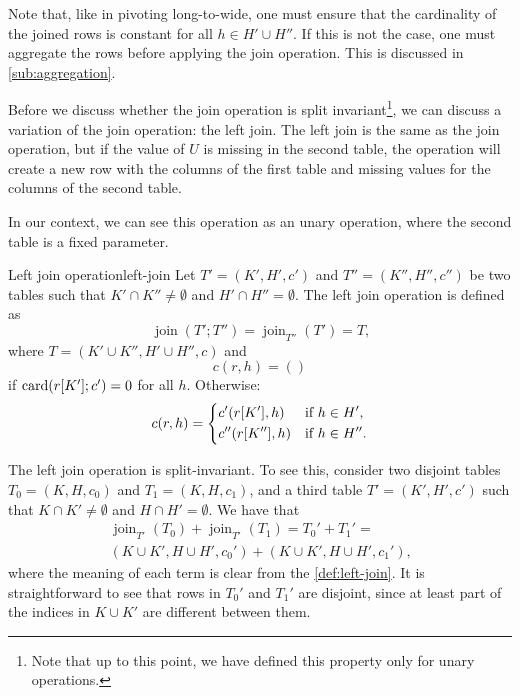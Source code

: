 Note that, like in pivoting long-to-wide, one must ensure that the cardinality of the
joined rows is constant for all $h \in H' \cup H''$.  If this is not the case, one must
aggregate the rows before applying the join operation.  This is discussed in
\cref{sub:aggregation}.

Before we discuss whether the join operation is split invariant\footnote{Note that up to
this point, we have defined this property only for unary operations.}, we can discuss a
variation of the join operation: the left join.  The left join is the same as the join
operation, but if the value of $U$ is missing in the second table, the operation will
create a new row with the columns of the first table and missing values for the columns of
the second table.

In our context, we can see this operation as an unary operation, where the second table is
a fixed parameter.

\begin{defbox}{Left join operation}{left-join}
  Let $T' = (K', H', c')$ and $T'' = (K'', H'', c'')$ be two tables such that $K'
  \cap K'' \neq \emptyset$ and $H' \cap H'' = \emptyset$.  The left join operation is
  defined as \[
    \operatorname{join}(T'; T'') = \operatorname{join}_{T''}(T') = T\text{,}
  \] where $T = (K' \cup K'', H' \cup H'', c)$ and \[
    c(r, h) = ()
  \] if $\rowcard[{r[K']; c'}] = 0$ for all $h$. Otherwise:
  \[
    c(r, h) = \begin{dcases}
      c'(r[K'], h) & \text{if } h \in H'\text{,} \\
      c''(r[K''], h) & \text{if } h \in H''\text{.}
    \end{dcases}
  \]
\end{defbox}

The left join operation is split-invariant.  To see this, consider two disjoint tables
$T_0 = (K, H, c_0)$ and $T_1 = (K, H, c_1)$, and a third table $T' = (K', H', c')$ such
that $K \cap K' \neq \emptyset$ and $H \cap H' = \emptyset$.  We have that
\begin{multline*}
  \operatorname{join}_{T'}(T_0) + \operatorname{join}_{T'}(T_1) =
  T_0' + T_1' =\\
    (K \cup K', H \cup H', c_0') + (K \cup K', H \cup H', c_1')\text{,}
\end{multline*}
where the meaning of each term is clear from the \cref{def:left-join}.
It is straightforward to see that rows in $T_0'$ and $T_1'$ are disjoint, since at least
part of the indices in $K \cup K'$ are different between them.

